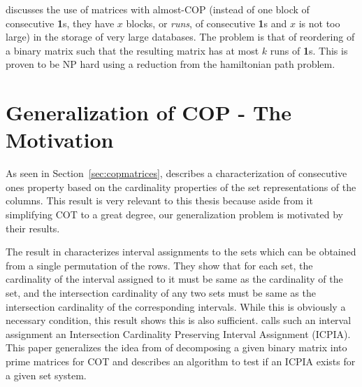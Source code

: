 \documentclass[MS,synopsis]{iitmdiss}
\def \un {\bf 1}
\def \secfirstparatrim {-5mm}
\begin{document}
\cite{jkckv04} discusses the use of matrices with almost-COP (instead
of one block of consecutive {\un}s, they have $x$ blocks, or {\em
  runs}, of consecutive {\un}s and $x$ is not too large) in the
storage of very large databases.  The problem is that of reordering of
a binary matrix such that the resulting matrix has at most $k$ runs of
{\un}s. This is proven to be NP hard using a reduction from the
hamiltonian path problem.
  

\section{Generalization of COP - The Motivation}  %
\label{sec:motive}
\vspace{\secfirstparatrim}  
As seen in Section~\ref{sec:copmatrices}, \cite{nsnrs09} describes a
characterization of consecutive ones property based on the cardinality
properties of the set representations of the columns. This result is
very relevant to this thesis because aside from it simplifying COT to
a great degree, our generalization problem is motivated by their
results.

The result in
\cite{nsnrs09} characterizes interval assignments to the sets which
can be obtained from a single permutation of the rows.  They show that
for each set, the cardinality of the interval assigned to it must be
same as the cardinality of the set, and the intersection cardinality
of any two sets must be same as the intersection cardinality of the
corresponding intervals.  While this is obviously a necessary
condition, this result shows this is also sufficient.  \cite{nsnrs09}
calls such an interval assignment an Intersection Cardinality
Preserving Interval Assignment (ICPIA).  This paper generalizes the
idea from \cite{wlh02} of decomposing a given binary matrix into prime
matrices for COT and describes an algorithm to test if an ICPIA exists
for a given set system.
\end{document}
